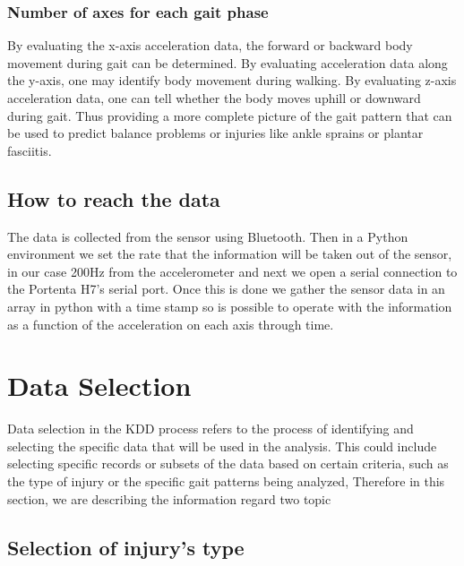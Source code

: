 \subsubsection{Number of axes for each gait phase}
By evaluating the x-axis acceleration data, the forward or backward body movement during gait can be determined. By evaluating acceleration data along the y-axis, one may identify body movement during walking. By evaluating z-axis acceleration data, one can tell whether the body moves uphill or downward during gait. Thus providing a more complete picture of the gait pattern that can be used to predict balance problems or injuries like ankle sprains or plantar fasciitis.

\subsection{How to reach the data}
The data is collected from the sensor using Bluetooth. Then in a Python environment we set the rate that the information will be taken out of the sensor, in our case 200Hz from the accelerometer and next we open a serial connection to the Portenta H7's serial port. Once this is done we gather the sensor data in an array in python with a time stamp so is possible to operate with the information as a function of the acceleration on each axis through time.

\section{Data Selection}

\bigskip

Data selection in the KDD process refers to the process of identifying and selecting the specific data that will be used in the analysis. This could include selecting specific records or subsets of the data based on certain criteria, such as the type of injury or the specific gait patterns being analyzed, Therefore in this section, we are describing the information regard two topic

\subsection{Selection of injury's type}


